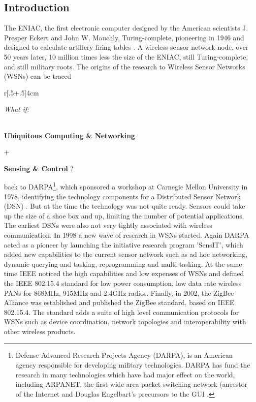\subsection{Introduction}
The ENIAC, the first electronic computer designed by the American scientists J. Presper Eckert and John W. Mauchly, Turing-complete,  pioneering in 1946 and designed to calculate artillery firing tables \citep{FLAMM}. A wireless sensor network node, over 50 years later, 10 million times less the size of the ENIAC, still Turing-complete, and still military roots. The origins of the research to Wireless Sensor Networks (WSNs) can be traced \begin{wrapfigure}[9]{r}[\dimexpr.5\width+.5\columnsep\relax]{4cm}
  \centering
  \parbox{4cm}{\textsl{What if: }
\begin{large}
\textbf{\\Ubiquitous Computing \& Networking} \begin{center}+\end{center} \textbf{Sensing \& Control} ?
\end{large}}
\end{wrapfigure}back to DARPA\footnote{Defense Advanced Research Projects Agency (DARPA), is an American agency responsible for developing military technologies. DARPA has fund the research in many technologies which have had major effect on the world, including ARPANET, the first wide-area packet switching network (ancestor of the Internet and Douglas Engelbart's precursors to the GUI \citep{DARWIKI}.}, which sponsored a workshop at Carnegie Mellon University in 1978, identifying the technology components for a Distributed Sensor Network (DSN) \citep{DAR}. But at the time the technology was not quite ready. Sensors could take up the size of a shoe box and up, limiting the number of potential applications. The earliest DSNs were also not very tightly associated with wireless communication. In 1998 a new wave of research in WSNs started. Again DARPA acted as a pioneer by launching the initiative research program 'SensIT', which added new capabilities to the current sensor network such as ad hoc networking, dynamic querying and tasking, reprogramming and multi-tasking. At the same time IEEE noticed the high capabilities and low expenses of WSNs and defined the IEEE 802.15.4 standard for low power consumption, low data rate wireless PANs for 868MHz, 915MHz and 2.4GHz radios. Finally, in 2002, the ZigBee Alliance was established and published the ZigBee standard, based on IEEE 802.15.4. The standard adds a suite of high level communication protocols for WSNs such as device coordination, network topologies and interoperability with other wireless products.\\
